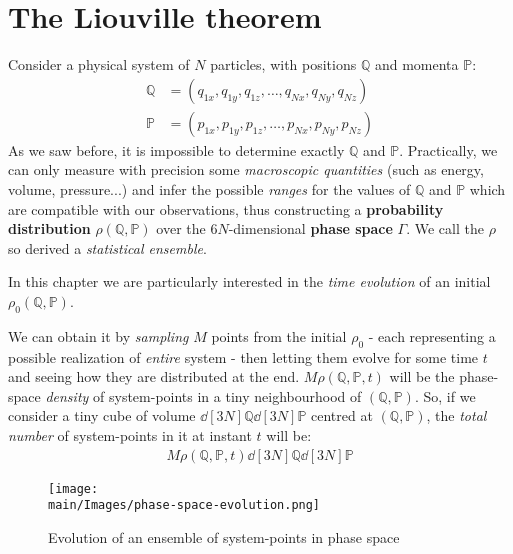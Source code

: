 \documentclass[../../main.tex]{subfiles}
\begin{document}
\section{The Liouville theorem}
Consider a physical system of $N$ particles, with positions $\mathbb{Q}$ and momenta $\mathbb{P}$:
\begin{align*}
    \mathbb{Q} &= (q_{1x}, q_{1y}, q_{1z}, \dots, q_{Nx}, q_{Ny}, q_{Nz})\\
    \mathbb{P} &= (p_{1x}, p_{1y}, p_{1z}, \dots, p_{Nx}, p_{Ny}, p_{Nz})
\end{align*} 
As we saw before, it is impossible to determine exactly $\mathbb{Q}$ and $\mathbb{P}$. Practically, we can only measure with precision some \textit{macroscopic quantities} (such as energy, volume, pressure...) and infer the possible \textit{ranges} for the values of $\mathbb{Q}$ and $\mathbb{P}$ which are compatible with our observations, thus constructing a \textbf{probability distribution} $\rho(\mathbb{Q},\mathbb{P})$ over the $6N$-dimensional \textbf{phase space} $\Gamma$. We call the $\rho$ so derived a \textit{statistical ensemble}. 

\medskip

In this chapter we are particularly interested in the \textit{time evolution} of an initial $\rho_0(\mathbb{Q},\mathbb{P})$. 

We can obtain it by \textit{sampling} $M$ points from the initial $\rho_0$ - each representing a possible realization of \textit{entire} system
- then letting them evolve for some time $t$ and seeing how they are distributed at the end. $M \rho(\mathbb{Q},\mathbb{P},t)$ will be the phase-space \textit{density} of system-points in a tiny neighbourhood of $(\mathbb{Q},\mathbb{P})$. So, if we consider a tiny cube of volume $\dd[3N]{\mathbb{Q}} \dd[3N]{\mathbb{P}}$ centred at $(\mathbb{Q},\mathbb{P})$, the \textit{total number} of system-points in it at instant $t$ will be:
\begin{align*}
    M \rho(\mathbb{Q},\mathbb{P},t) \dd[3N]{\mathbb{Q}} \dd[3N]{\mathbb{P}}
\end{align*} 

\begin{figure}[H]
    \centering
    \texttt{[image: \\main/Images/phase-space-evolution.png]}
    \caption{Evolution of an ensemble of system-points in phase space}
    \label{fig:ensemble-evolution}
\end{figure}
\end{document}
